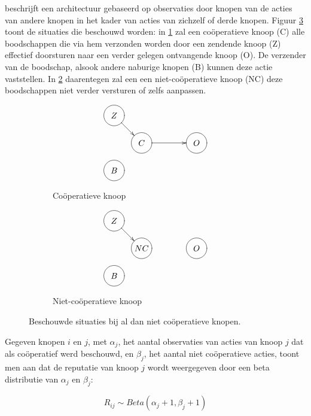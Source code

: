 \cite{ganeriwal2008reputation} beschrijft een architectuur gebaseerd op
observaties door knopen van de acties van andere knopen in het kader van acties
van zichzelf of derde knopen. Figuur \ref{fig:reputation-cooperation} toont de
situaties die beschouwd worden: in \ref{fig:reputation-cooperative-node} zal
een co\"operatieve knoop (C) alle boodschappen die via hem verzonden worden
door een zendende knoop (Z) effectief doorsturen naar een verder gelegen
ontvangende knoop (O). De verzender van de boodschap, alsook andere naburige
knopen (B) kunnen deze actie vaststellen. In
\ref{fig:reputation-uncooperative-node} daarentegen zal een een
niet-co\"operatieve knoop (NC) deze boodschappen niet verder versturen of zelfs
aanpassen.

\begin{figure}
\centering
\begin{subfigure}{.49\textwidth}
\centering
\[ \entrymodifiers={-=+++[o][F-]}
 \xymatrix@!=0.75pc {
  Z \ar[dr] & *{}       & *{} & *{} \\
  *{}       & C \ar[rr] & *{} & O   \\
  B         & *{}       & *{} & *{} \\
 }
\]
\caption{Co\"operatieve knoop}
\label{fig:reputation-cooperative-node}
\end{subfigure}
\begin{subfigure}{.49\textwidth}
\centering
\[ \entrymodifiers={-=+++[o][F-]}
 \xymatrix@!=0.75pc {
  Z \ar[dr] & *{}       & *{} & *{} \\
  *{}       & NC        & *{} & O   \\
  B         & *{}       & *{} & *{} \\
 }
\]
\caption{Niet-co\"operatieve knoop}
\label{fig:reputation-uncooperative-node}
\end{subfigure}
\caption{Beschouwde situaties bij al dan niet co\"operatieve knopen.}
\label{fig:reputation-cooperation}
\end{figure}

Gegeven knopen $i$ en $j$, met $\alpha_j$, het aantal observaties van acties van
knoop $j$ dat als co\"operatief werd beschouwd, en $\beta_j$, het aantal niet
co\"operatieve acties, toont men aan dat de reputatie van knoop $j$ wordt
weergegeven door een beta distributie van $\alpha_j$ en $\beta_j$:

\begin{equation} \label{eq:reputation-beta}
R_{ij} \sim Beta(\alpha_j+1, \beta_j+1)
\end{equation}

